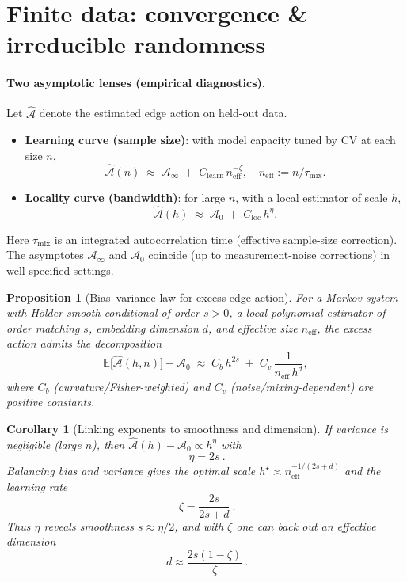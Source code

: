 \documentclass[11pt]{article}
\newtheorem{proposition}{Proposition}
\newtheorem{corollary}{Corollary}
\newcommand{\E}{\mathbb{E}}
\newcommand{\1}{\mathbf{1}}
\begin{document}
\section{Finite data: convergence \& irreducible randomness}

\paragraph{Two asymptotic lenses (empirical diagnostics).}
Let \(\widehat{\mathcal A}\) denote the estimated edge action on held-out data.
\begin{itemize}[leftmargin=1.7em,itemsep=1.5pt,topsep=2pt]
\item \textbf{Learning curve (sample size)}: with model capacity tuned by CV at each size \(n\),
\[
\widehat{\mathcal A}(n) \;\approx\; \mathcal A_\infty \;+\; C_{\mathrm{learn}}\, n_{\mathrm{eff}}^{-\zeta}, \quad n_{\mathrm{eff}}:=n/\tau_{\mathrm{mix}}.
\]
\item \textbf{Locality curve (bandwidth)}: for large \(n\), with a local estimator of scale \(h\),
\[
\widehat{\mathcal A}(h) \;\approx\; \mathcal A_0 \;+\; C_{\mathrm{loc}}\, h^{\eta}.
\]
\end{itemize}
Here \(\tau_{\mathrm{mix}}\) is an integrated autocorrelation time (effective sample-size correction). The asymptotes \(\mathcal A_\infty\) and \(\mathcal A_0\) coincide (up to measurement-noise corrections) in well-specified settings.

\begin{proposition}[Bias--variance law for excess edge action]
For a Markov system with Hölder smooth conditional of order \(s>0\), a local polynomial estimator of order matching \(s\), embedding dimension \(d\), and effective size \(n_{\mathrm{eff}}\), the excess action admits the decomposition
\[
\E\big[\widehat{\mathcal A}(h,n)\big]-\mathcal A_0
\;\approx\;
C_b\, h^{2s} \;+\; C_v\,\frac{1}{n_{\mathrm{eff}}\,h^{d}},
\]
where \(C_b\) (curvature/Fisher-weighted) and \(C_v\) (noise/mixing-dependent) are positive constants.
\end{proposition}

\begin{corollary}[Linking exponents to smoothness and dimension]
If variance is negligible (large \(n\)), then \(\widehat{\mathcal A}(h)-\mathcal A_0\propto h^{\eta}\) with
\[
\boxed{\ \eta=2s\ }.
\]
Balancing bias and variance gives the optimal scale \(h^\star\asymp n_{\mathrm{eff}}^{-1/(2s+d)}\) and the learning rate
\[
\boxed{\ \zeta=\frac{2s}{2s+d}\ }.
\]
Thus \(\eta\) reveals smoothness \(s\approx \eta/2\), and with \(\zeta\) one can back out an \emph{effective} dimension
\[
\boxed{\ d \approx \frac{2s(1-\zeta)}{\zeta}\ }.
\]
\end{corollary}
\end{document}
